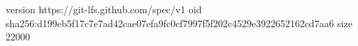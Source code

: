 version https://git-lfs.github.com/spec/v1
oid sha256:d199eb5f17c7e7ad42cae07efa9fc0cf7997f5f202c4529e3922652162cd7aa6
size 22000
